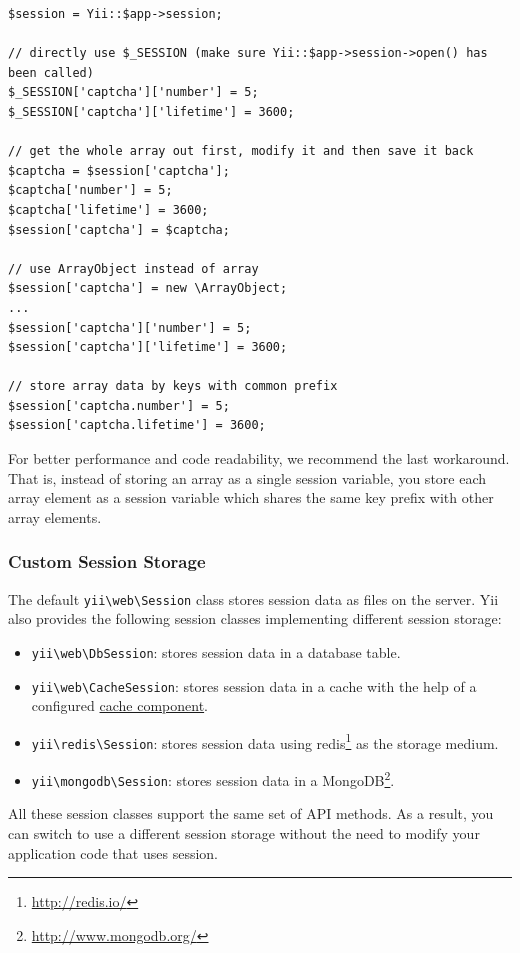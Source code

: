 \lstset{language=php}\begin{lstlisting}
$session = Yii::$app->session;

// directly use $_SESSION (make sure Yii::$app->session->open() has been called)
$_SESSION['captcha']['number'] = 5;
$_SESSION['captcha']['lifetime'] = 3600;

// get the whole array out first, modify it and then save it back
$captcha = $session['captcha'];
$captcha['number'] = 5;
$captcha['lifetime'] = 3600;
$session['captcha'] = $captcha;

// use ArrayObject instead of array
$session['captcha'] = new \ArrayObject;
...
$session['captcha']['number'] = 5;
$session['captcha']['lifetime'] = 3600;

// store array data by keys with common prefix
$session['captcha.number'] = 5;
$session['captcha.lifetime'] = 3600;
\end{lstlisting}
For better performance and code readability, we recommend the last workaround. That is, instead of storing
an array as a single session variable, you store each array element as a session variable which shares the same
key prefix with other array elements.

\subsubsection{Custom Session Storage \label{runtime-sessions-cookies.md::custom-session-storage}}
The default \texttt{yii{\allowbreak{}\textbackslash}web{\allowbreak{}\textbackslash}Session} class stores session data as files on the server. Yii also provides the following
session classes implementing different session storage:

\begin{itemize}
\item \texttt{yii{\allowbreak{}\textbackslash}web{\allowbreak{}\textbackslash}DbSession}: stores session data in a database table.
\item \texttt{yii{\allowbreak{}\textbackslash}web{\allowbreak{}\textbackslash}CacheSession}: stores session data in a cache with the help of a configured \hyperref[caching-data.md::cache-components]{cache component}.
\item \texttt{yii{\allowbreak{}\textbackslash}redis{\allowbreak{}\textbackslash}Session}: stores session data using redis\footnote{\url{http://redis.io/}} as the storage medium.
\item \texttt{yii{\allowbreak{}\textbackslash}mongodb{\allowbreak{}\textbackslash}Session}: stores session data in a MongoDB\footnote{\url{http://www.mongodb.org/}}.
\end{itemize}
All these session classes support the same set of API methods. As a result, you can switch to use a different
session storage without the need to modify your application code that uses session.

